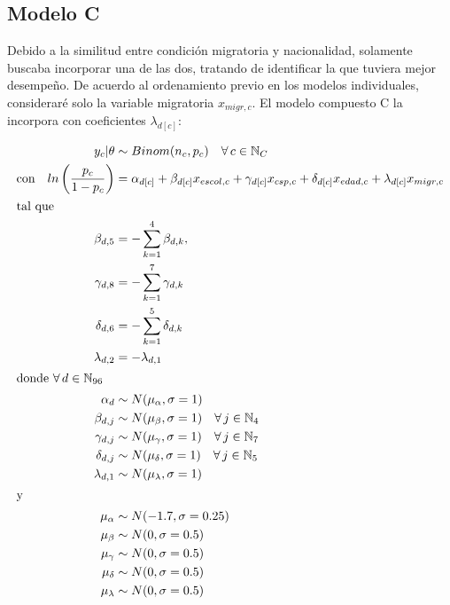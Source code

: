 \subsection*{Modelo C}

Debido a la similitud entre condición migratoria y nacionalidad, solamente buscaba incorporar una de las dos, tratando de identificar la que tuviera mejor desempeño. De acuerdo al ordenamiento previo en los modelos individuales, consideraré solo la variable migratoria $x_{migr,c}$. El modelo compuesto C la incorpora con coeficientes $\lambda_{d[c]}$:

\begin{align}\label{eq:Modelo_Comp_C}
y_c|\theta & \sim Binom(n_c,p_c) \quad \forall \, c \in \mathbb{N}_C \nonumber \\
\text{con} \quad ln\left(\dfrac{p_c}{1-p_c}\right) &= \alpha_{d[c]} + \beta_{d[c]} x_{escol,c} + \gamma_{d[c]} x_{csp,c} + \delta_{d[c]} x_{edad,c} + \lambda_{d[c]} x_{migr,c} \\ 
\intertext{tal que} 
\beta_{d,5} &= -\sum\limits_{k = 1}^{4} \beta_{d,k}, \nonumber \\
\gamma_{d,8} &= -\sum\limits_{k = 1}^{7} \gamma_{d,k} \nonumber \\
\delta_{d,6} &= -\sum\limits_{k = 1}^{5} \delta_{d,k} \nonumber \\
\lambda_{d,2} &= -\lambda_{d,1} \nonumber \\
\intertext{donde $\forall \, d \in \mathbb{N}_{96}$}
\alpha_d & \sim N(\mu_{\alpha}, \sigma=1) \quad  \nonumber \\
\beta_{d,j} & \sim N(\mu_{\beta}, \sigma=1) \quad \forall \, j \in \mathbb{N}_{4} \nonumber \\
\gamma_{d,j} & \sim N(\mu_{\gamma}, \sigma=1) \quad \forall \, j \in \mathbb{N}_{7} \nonumber \\
\delta_{d,j} & \sim N(\mu_{\delta}, \sigma=1) \quad \forall \, j \in \mathbb{N}_{5} \nonumber \\
\lambda_{d,1} & \sim N(\mu_{\lambda}, \sigma=1) \nonumber \\
\intertext{y}
\mu_{\alpha} &\sim N(-1.7,\sigma=0.25) \nonumber \\
\mu_{\beta} &\sim N(0,\sigma=0.5) \nonumber \\
\mu_{\gamma} &\sim N(0,\sigma=0.5) \nonumber \\
\mu_{\delta} &\sim N(0,\sigma=0.5) \nonumber \\
\mu_{\lambda} &\sim N(0,\sigma=0.5) \nonumber
\end{align}

